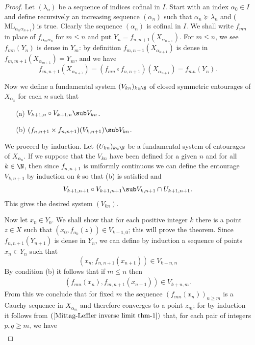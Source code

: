 \begin{proof}
Let $(\lambda_n)$ be a sequence of indices cofinal in $I$. Start with an index $\alpha_0\in I$ and define recursively an increasing sequence $(\alpha_n)$ such that $\alpha_n\succeq\lambda_n$ and ($\text{ML}_{\alpha_n\alpha_{n+1}}$) is true. Clearly the sequence $(\alpha_n)$ is cofinal in $I$. We shall write $f_{mn}$ in place of $f_{\alpha_m\alpha_n}$ for $m\leq n$ and put $Y_n=f_{n,n+1}(X_{\alpha_{n+1}})$. For $m\leq n$, we see $f_{mn}(Y_n)$ is dense in $Y_m$: by definition $f_{m,n+1}(X_{\alpha_{n+1}})$ is dense in $f_{m,m+1}(X_{\alpha_{m+1}})=Y_m$, and we have
\[f_{m,n+1}(X_{\alpha_{n+1}})=(f_{mn}\circ f_{n,n+1})(X_{\alpha_{n+1}})=f_{mn}(Y_n).\]

Now we define a fundamental system $(V_{kn})_{k\in\N}$ of closed symmetric entourages of $X_{\alpha_n}$ for each $n$ such that
\begin{itemize}
\item[(a)] $V_{k+1,n}\circ V_{k+1,n}\sub V_{kn}$.
\item[(b)] $(f_{n,n+1}\times f_{n,n+1})(V_{k,n+1})\sub V_{kn}$.
\end{itemize}
We proceed by induction. Let $(U_{kn})_{k\in\N}$ be a fundamental system of entourages of $X_{\alpha_n}$. If we suppose that the $V_{kn}$ have been defined for a given $n$ and for all $k\in\N$, then since $f_{n,n+1}$ is uniformly continuous we can define the entourage $V_{k,n+1}$ by induction on $k$ so that (b) is satisfied and
\[V_{k+1,n+1}\circ V_{k+1,n+1}\sub V_{k,n+1}\cap U_{k+1,n+1}.\]
This gives the desired system $(V_{kn})$.\par
Now let $x_0\in Y_0$. We shall show that for each positive integer $k$ there is a point $z\in X$ such that $(x_0,f_{\alpha_0}(z))\in V_{k-1,0}$; this will prove the theorem. Since $f_{n,n+1}(Y_{n+1})$ is dense in $Y_n$, we can define by induction a sequence of points $x_n\in Y_n$ such that
\[(x_n,f_{n,n+1}(x_{n+1}))\in V_{k+n,n}\]
By condition (b) it follows that if $m\leq n$ then
\begin{align}\label{Mittag-Leffler inverse limit thm-1}
(f_{mn}(x_n),f_{m,n+1}(x_{n+1}))\in V_{k+n,m}.
\end{align}
From this we conclude that for fixed $m$ the sequence $(f_{mn}(x_n))_{n\geq m}$ is a Cauchy sequence in $X_{\alpha_m}$ and therefore converges to a point $z_m$; for by induction it follows from $(\ref{Mittag-Leffler inverse limit thm-1})$ that, for each pair of integers $p,q\geq m$, we have
\begin{align}\label{Mittag-Leffler inverse limit thm-2}

\end{align}
\end{proof}
